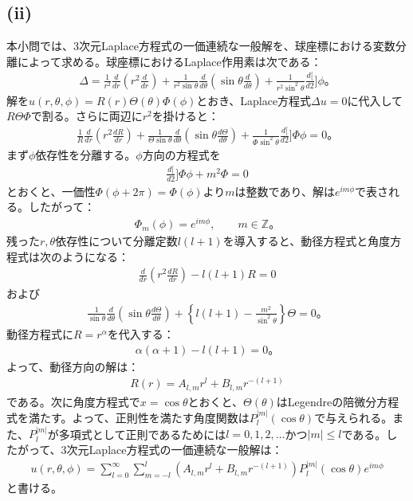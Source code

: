 \documentclass[platex,dvipdfmx,a4paper]{jsarticle}
\newcommand{\bbn}[2]{\frac{d #1}{d #2}}
\newcommand{\ssum}[3]{\sum_{#1=#2}^#3}
\begin{document}
  \subsection*{(ii)}
  本小問では、3次元Laplace方程式の一価連続な一般解を、球座標における変数分離によって求める。球座標におけるLaplace作用素は次である：
  \begin{align*}
    \Delta=\frac{1}{r^2}\bbn{}{r}\left(r^2\bbn{}{r}\right)+\frac{1}{r^2\sin\theta}\bbn{}{\theta}\left(\sin\theta\bbn{}{\theta}\right)+\frac{1}{r^2\sin^2\theta}\bbn[2]{}{\phi}。
  \end{align*}
  解を$u(r,\theta,\phi)=R(r)\Theta(\theta)\Phi(\phi)$とおき、Laplace方程式$\Delta u=0$に代入して$R\Theta\Phi$で割る。さらに両辺に$r^2$を掛けると：
  \begin{align*}
    \frac{1}{R}\bbn{}{r}\left(r^2\bbn{R}{r}\right)+\frac{1}{\Theta\sin\theta}\bbn{}{\theta}\left(\sin\theta\bbn{\Theta}{\theta}\right)+\frac{1}{\Phi\sin^2\theta}\bbn[2]{\Phi}{\phi}=0。
  \end{align*}
  まず$\phi$依存性を分離する。$\phi$方向の方程式を
  \begin{align*}
    \bbn[2]{\Phi}{\phi}+m^2\Phi=0
  \end{align*}
  とおくと、一価性$\Phi(\phi+2\pi)=\Phi(\phi)$より$m$は整数であり、解は$e^{im\phi}$で表される。したがって：
  \begin{align*}
    \Phi_m(\phi)=e^{im\phi},\qquad m\in\mathbb{Z}。
  \end{align*}
  残った$r,\theta$依存性について分離定数$l(l+1)$を導入すると、動径方程式と角度方程式は次のようになる：
  \begin{align*}
    \bbn{}{r}\left(r^2\bbn{R}{r}\right)-l(l+1)R=0
  \end{align*}
  および
  \begin{align*}
    \frac{1}{\sin\theta}\bbn{}{\theta}\left(\sin\theta\bbn{\Theta}{\theta}\right)+\left\{l(l+1)-\frac{m^2}{\sin^2\theta}\right\}\Theta=0。
  \end{align*}
  動径方程式に$R=r^\alpha$を代入する：
  \begin{align*}
    \alpha(\alpha+1)-l(l+1)=0。
  \end{align*}
  よって、動径方向の解は：
  \begin{align*}
    R(r)=A_{l,m}r^l+B_{l,m}r^{-(l+1)}
  \end{align*}
  である。次に角度方程式で$x=\cos\theta$とおくと、$\Theta(\theta)$はLegendreの陪微分方程式を満たす。よって、正則性を満たす角度関数は$P_l^{|m|}(\cos\theta)$で与えられる。また、$P_l^{|m|}$が多項式として正則であるためには$l=0,1,2,\ldots$かつ$|m|\leq l$である。したがって、3次元Laplace方程式の一価連続な一般解は：
  \begin{align*}
    u(r,\theta,\phi)=\ssum{l}{0}{\infty}\ssum{m}{-l}{l}\left(A_{l,m}r^l+B_{l,m}r^{-(l+1)}\right)P_l^{|m|}(\cos\theta)e^{im\phi}
  \end{align*}
  と書ける。
  
\end{document}
